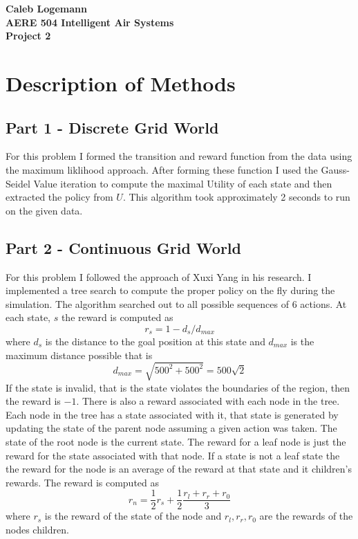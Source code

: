 \documentclass[12pt, oneside]{article}
\begin{document}
\noindent \textbf{\Large{Caleb Logemann \\
AERE 504 Intelligent Air Systems \\
Project 2
}}

\section{Description of Methods}
  \subsection{Part 1 - Discrete Grid World}
    For this problem I formed the transition and reward function from the data
    using the maximum liklihood approach.
    After forming these function I used the Gauss-Seidel Value iteration to
    compute the maximal Utility of each state and then extracted the policy
    from $U$.
    This algorithm took approximately 2 seconds to run on the given data.

  \subsection{Part 2 - Continuous Grid World}
    For this problem I followed the approach of Xuxi Yang in his research.
    I implemented a tree search to compute the proper policy on the fly during
    the simulation.
    The algorithm searched out to all possible sequences of 6 actions.
    At each state, $s$ the reward is computed as
    \[
      r_s = 1 - d_s/d_{max}
    \]
    where $d_s$ is the distance to the goal position at this state and $d_{max}$ is
    the maximum distance possible that is
    \[
      d_{max} = \sqrt{500^2 + 500^2} = 500\sqrt{2}
    \]
    If the state is invalid, that is the state violates the boundaries of the region,
    then the reward is $-1$.
    There is also a reward associated with each node in the tree.
    Each node in the tree has a state associated with it, that state is generated by
    updating the state of the parent node assuming a given action was taken.
    The state of the root node is the current state.
    The reward for a leaf node is just the reward for the state associated with
    that node.
    If a state is not a leaf state the the reward for the node is an average
    of the reward at that state and it children's rewards.
    The reward is computed as
    \[
      r_n = \frac{1}{2}r_s + \frac{1}{2} \frac{r_l + r_r + r_0}{3}
    \]
    where $r_s$ is the reward of the state of the node and $r_l, r_r, r_0$ are
    the rewards of the nodes children.
\end{document}
